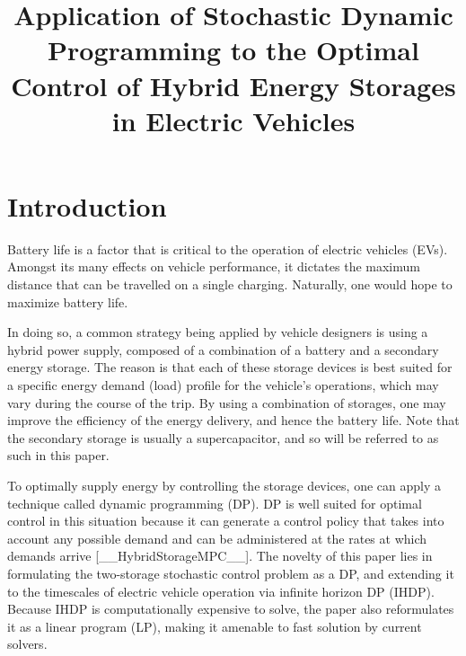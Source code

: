 \documentclass[conference]{IEEEtran}
\begin{document}
\title{Application of Stochastic Dynamic Programming to the Optimal Control of Hybrid Energy Storages in Electric Vehicles}

\author{
}


\maketitle


\section{Introduction}
Battery life is a factor that is critical to the operation of electric vehicles (EVs). Amongst its many effects on vehicle performance, it dictates the maximum distance that can be travelled on a single charging. Naturally, one would hope to maximize battery life.

In doing so, a common strategy being applied by vehicle designers is using a hybrid power supply, composed of a combination of a battery and a secondary energy storage. \cite{thounthong2009energy} The reason is that each of these storage devices is best suited for a specific energy demand (load) profile for the vehicle's operations, which may vary during the course of the trip. \cite{thounthong2009energy} By using a combination of storages, one may improve the efficiency of the energy delivery, and hence the battery life. Note that the secondary storage is usually a supercapacitor, and so will be referred to as such in this paper.

To optimally supply energy by controlling the storage devices, one can apply a technique called dynamic programming (DP). DP is well suited for optimal control in this situation because it can generate a control policy that takes into account any possible demand and can be administered at the rates at which demands arrive [__HybridStorageMPC__]. The novelty of this paper lies in formulating the two-storage stochastic control problem as a DP, and extending it to the timescales of electric vehicle operation via infinite horizon DP (IHDP). Because IHDP is computationally expensive to solve, the paper also reformulates it as a linear program (LP), making it amenable to fast solution by current solvers. 
\end{document}
